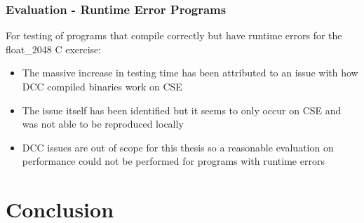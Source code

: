 \documentclass[xcolor, handout]{beamer}
\begin{document}
\begin{frame}
	\frametitle{Evaluation - Runtime Error Programs}
	For testing of programs that compile correctly but have runtime errors for the float\_2048 C exercise:\\
	\pause
	\begin{itemize}
		\setlength\itemsep{0.75em}
		\item The massive increase in testing time has been attributed to an issue with how DCC compiled binaries work on CSE
			\pause
		\item The issue itself has been identified but it seems to only occur on CSE and was not able to be reproduced locally
			\pause
		\item DCC issues are out of scope for this thesis so a reasonable evaluation on performance could not be performed for programs with runtime errors
	\end{itemize}
\end{frame}

\section{Conclusion}
\end{document}
